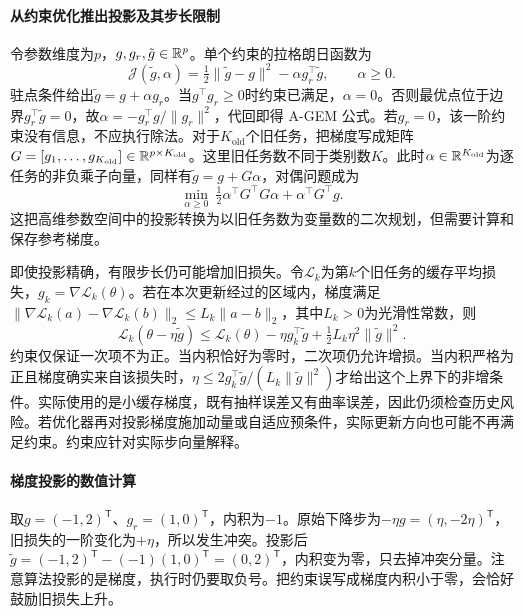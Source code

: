 \paragraph{从约束优化推出投影及其步长限制}
令参数维度为$p$，$g,g_r,\tilde g\in\mathbb{R}^p$。单个约束的拉格朗日函数为
\begin{equation}
 \mathcal J(\tilde g,\alpha)=\tfrac12\|\tilde g-g\|^2-\alpha g_r^\top\tilde g,
 \qquad\alpha\geq0.
\end{equation}
驻点条件给出$\tilde g=g+\alpha g_r$。当$g^\top g_r\geq0$时约束已满足，$\alpha=0$。否则最优点位于边界$g_r^\top\tilde g=0$，故$\alpha=-g_r^\top g/\|g_r\|^2$，代回即得 A-GEM 公式。若$g_r=0$，该一阶约束没有信息，不应执行除法。对于$K_{\mathrm{old}}$个旧任务，把梯度写成矩阵$G=[g_1,\ldots,g_{K_{\mathrm{old}}}]\in\mathbb{R}^{p\times K_{\mathrm{old}}}$。这里旧任务数不同于类别数$K$。此时$\alpha\in\mathbb{R}^{K_{\mathrm{old}}}$为逐任务的非负乘子向量，同样有$\tilde g=g+G\alpha$，对偶问题成为
\begin{equation}
 \min_{\alpha\geq0}\ \tfrac12\alpha^\top G^\top G\alpha+\alpha^\top G^\top g.
\end{equation}
这把高维参数空间中的投影转换为以旧任务数为变量数的二次规划，但需要计算和保存参考梯度。

即使投影精确，有限步长仍可能增加旧损失。令$\mathcal L_k$为第$k$个旧任务的缓存平均损失，$g_k=\nabla\mathcal L_k(\theta)$。若在本次更新经过的区域内，梯度满足$\|\nabla\mathcal L_k(a)-\nabla\mathcal L_k(b)\|_2\leq L_k\|a-b\|_2$，其中$L_k>0$为光滑性常数，则
\begin{equation}
 \mathcal L_k(\theta-\eta\tilde g)
 \leq\mathcal L_k(\theta)-\eta g_k^\top\tilde g
 +\tfrac12L_k\eta^2\|\tilde g\|^2.
\end{equation}
约束仅保证一次项不为正。当内积恰好为零时，二次项仍允许增损。当内积严格为正且梯度确实来自该损失时，$\eta\leq2g_k^\top\tilde g/(L_k\|\tilde g\|^2)$才给出这个上界下的非增条件。实际使用的是小缓存梯度，既有抽样误差又有曲率误差，因此仍须检查历史风险。若优化器再对投影梯度施加动量或自适应预条件，实际更新方向也可能不再满足约束。约束应针对实际步向量解释。

\paragraph{梯度投影的数值计算}
取$g=(-1,2)^{\mathsf T}$、$g_r=(1,0)^{\mathsf T}$，内积为$-1$。原始下降步为$-\eta g=(\eta,-2\eta)^{\mathsf T}$，旧损失的一阶变化为$+\eta$，所以发生冲突。投影后$\tilde g=(-1,2)^{\mathsf T}-(-1)(1,0)^{\mathsf T}=(0,2)^{\mathsf T}$，内积变为零，只去掉冲突分量。注意算法投影的是梯度，执行时仍要取负号。把约束误写成梯度内积小于零，会恰好鼓励旧损失上升。

